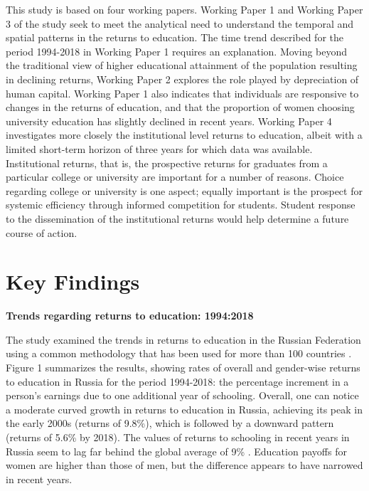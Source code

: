 \documentclass[alpha-refs]{wiley-article-04t}
\begin{document}
\vspace{1em}


This study is based on four working papers. Working Paper 1 and 
Working Paper 3 of the study seek to meet the analytical need to understand 
the temporal and spatial patterns in the returns to education. The time 
trend described for the period 1994-2018 in Working Paper 1 requires an 
explanation. Moving beyond the traditional view of higher 
educational attainment of the population resulting in declining returns, 
Working Paper 2 explores the role played by depreciation of human capital. 
Working Paper 1 also indicates that individuals are responsive to changes 
in the returns of education, and that the proportion of women choosing 
university education has slightly declined in recent years. Working Paper 4 
investigates more closely the institutional level returns to education, 
albeit with a limited short-term horizon of three years for which data was 
available. Institutional returns, that is, the prospective returns for 
graduates from a particular college or university are important for a 
number of reasons. Choice regarding college or university is one aspect; 
equally important is the prospect for systemic efficiency through informed 
competition for students. Student response to the dissemination of the 
institutional returns would help determine a future course of action. 

\section{Key Findings}


\textbf{Trends regarding returns to education: 1994:2018}

\vspace{1em}

\noindent The study examined the trends in returns to education in the 
Russian 
Federation using a common methodology that has been used for more than 100 
countries \parencite{Montenegro_Patrinos2014,Psacharopoulos_Patrinos2018}. 
Figure 1 summarizes the results, showing rates of overall and 
gender-wise returns to education in Russia for the period 1994-2018: the 
percentage increment in a person's earnings due to one additional year of 
schooling. Overall, one can notice a moderate curved growth in returns to 
education in Russia, achieving its peak in the early 2000s (returns of 
9.8\%), which is followed by a downward pattern (returns of 5.6\% by 2018). 
The values of returns to schooling in recent years in Russia seem to lag 
far behind the global average of 9\% 
\parencite{Psacharopoulos_Patrinos2018}. Education payoffs for women are 
higher than those of men, but the difference appears to have narrowed in 
recent years.\\  
\end{document}
